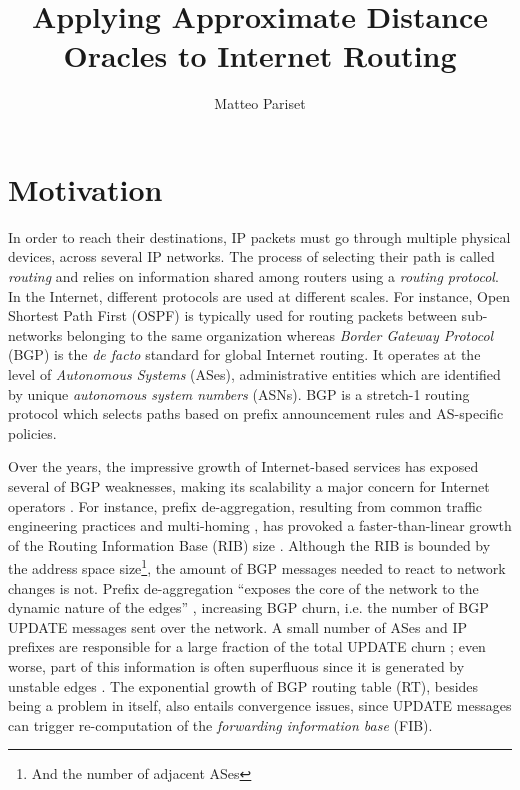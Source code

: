 \documentclass[a4paper,11pt,oneside]{report}
\title{Applying Approximate Distance Oracles to Internet Routing}
\author{Matteo Pariset}
\begin{document}
\maketitle


\chapter{Motivation}
In order to reach their destinations, IP packets must go through multiple physical devices, across several IP networks. The process of selecting their path is called \emph{routing} and relies on information shared among routers using a \emph{routing protocol}. In the Internet, different protocols are used at different scales. For instance, Open Shortest Path First (OSPF) is typically used for routing packets between sub-networks belonging to the same organization whereas \emph{Border Gateway Protocol} (BGP) is the \textit{de facto} standard for global Internet routing. It operates at the level of \emph{Autonomous Systems} (ASes), administrative entities which are identified by unique \emph{autonomous system numbers} (ASNs).
BGP is a stretch-1 routing protocol which selects paths based on prefix announcement rules and AS-specific policies.

\bigskip
Over the years, the impressive growth of Internet-based services has exposed several of BGP weaknesses, making its scalability a major concern for Internet operators \cite{elmokashfiScalabilityBGPRole2010}. For instance, prefix de-aggregation, resulting from common traffic engineering practices and multi-homing \cite{dReportIABWorkshop}, has provoked a faster-than-linear growth of the Routing Information Base (RIB) size \cite{Potaroo}. Although the RIB is bounded by the address space size\footnote{And the number of adjacent ASes}, the amount of BGP messages needed to react to network changes is not. Prefix de-aggregation ``exposes the core of the network to the dynamic nature of the edges'' \cite{dReportIABWorkshop}, increasing BGP churn, i.e. the number of BGP UPDATE messages sent over the network. A small number of ASes and IP prefixes are responsible for a large fraction of the total UPDATE churn \cite{BGPchurnCore2012}; even worse, part of this information is often superfluous since it is generated by unstable edges \cite{Oliveira_measurementof}.
The exponential growth of BGP routing table (RT), besides being a problem in itself, also entails convergence issues, since UPDATE messages can trigger re-computation of the \emph{forwarding information base} (FIB).
\end{document}
